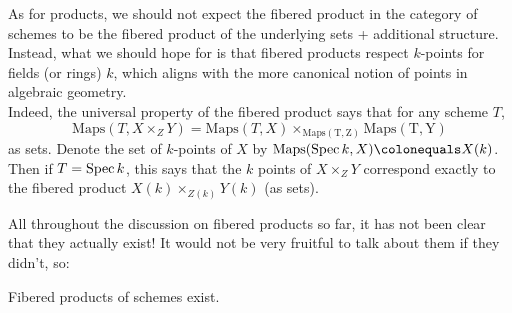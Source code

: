 \begin{remark}
    As for products, we should not expect the fibered product in the category of schemes to be the fibered product of the underlying sets + additional structure. Instead, what we should hope for is that fibered products respect $k$-points for fields (or rings) $k$, which aligns with the more canonical notion of points in algebraic geometry. \\
    Indeed, the universal property of the fibered product says that for any scheme $T$, 
    \[
    \mathrm{Maps}(T,X\times_ZY)=\mathrm{Maps}(T,X)\times_{\mathrm{Maps(T,Z)}}\mathrm{Maps(T,Y)}
    \]
    as sets. Denote the set of $k$-points of $X$ by $\mathrm{Maps}(\Spec k,X)\colonequals X(k)$. Then if $T=\operatorname{Spec} k$, this says that the $k$ points of $X\times_ZY$ correspond exactly to the fibered product $X(k)\times_{Z(k)}Y(k)$ (as sets). 
\end{remark}
All throughout the discussion on fibered products so far, it has not been clear that they actually exist! It would not be very fruitful to talk about them if they didn't, so:
\begin{theorem}
    Fibered products of schemes exist.
\end{theorem}
